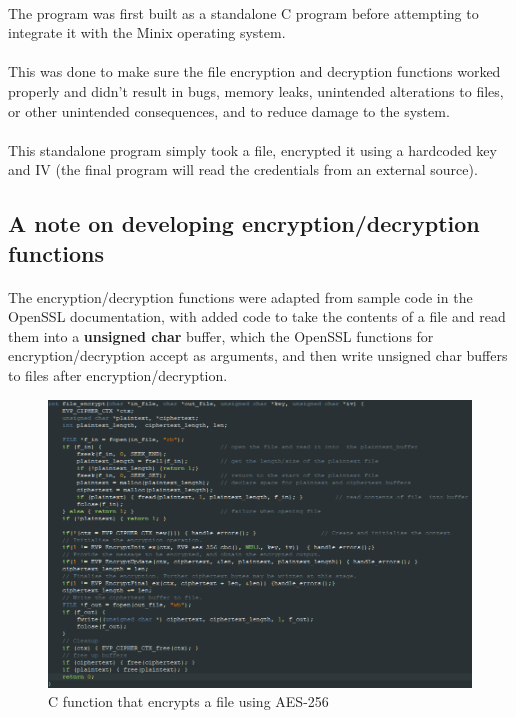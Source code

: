 \documentclass{article}
\begin{document}
    \paragraph{}The program was first built as a standalone C program before attempting to integrate it with the Minix operating system. 
    \paragraph{}This was done to make sure the file encryption and decryption functions worked properly and didn't result in bugs, memory leaks, unintended alterations to files, or other unintended consequences, and to reduce damage to the system.
    \paragraph{}This standalone program simply took a file, encrypted it using a hardcoded key and IV (the final program will read the credentials from an external source).

    \subsection{A note on developing encryption/decryption functions}
        \paragraph{}The encryption/decryption functions were adapted from sample code in the OpenSSL documentation, with added code to take the contents of a file and read them into a \textbf{unsigned char} buffer, which the OpenSSL functions for encryption/decryption accept as arguments, and then write unsigned char buffers to files after encryption/decryption.

        \begin{figure}[htbp]
            \centering\includegraphics[width=\textwidth]{encrypt_function_screenshot_1.png}
            \caption{C function that encrypts a file using AES-256}
            \label{fig:my_label}
        \end{figure}
    \newpage
\end{document}
